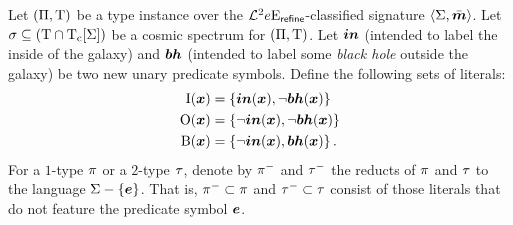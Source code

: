 \begin{definition}
Let $(\Pi,\mathrm{T})$ be a type instance over the
$\mathcal{L}^{2}_{{}}{e}\mathrm{E}_{\mathsf{refine}}$-classified signature $\left\langle \mathrm{\Sigma},\bar{\bm{m}} \right\rangle$.
Let $\sigma \subseteq (\mathrm{T} \cap \mathrm{T}_{\mathrm{c}}[\mathrm{\Sigma}])$ be a cosmic spectrum for
$(\Pi,\mathrm{T})$.
Let $\bm{in}$ (intended to label the inside of the galaxy) and $\bm{bh}$ (intended to
label some \emph{black hole} outside the galaxy) be two new unary predicate
symbols. Define the following sets of literals: 
\begin{align*}
  \mathrm{I}(\bm{x}) &= \left\{\bm{in}(\bm{x}),\lnot\bm{bh}(\bm{x})\right\} \\
  \mathrm{O}(\bm{x}) &= \left\{\lnot\bm{in}(\bm{x}), \lnot\bm{bh}(\bm{x})\right\} \\
  \mathrm{B}(\bm{x}) &= \left\{\lnot\bm{in}(\bm{x}), \bm{bh}(\bm{x})\right\}.
\end{align*}
For a $1$-type $\pi$ or a $2$-type $\tau$, denote by $\pi^{-}$ and $\tau^{-}$ the reducts of $\pi$ and
$\tau$ to the language $\mathrm{\Sigma} - \left\{\bm{e}\right\}$.
That is, $\pi^{-} \subset \pi$ and $\tau^{-} \subset \tau$ consist of
those literals that do not feature the predicate symbol $\bm{e}$.


\end{definition}
